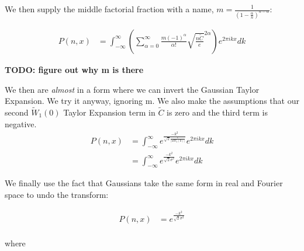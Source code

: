 \documentclass[10pt]{article} %
\begin{document}


We then supply the middle factorial fraction with a name, $m = \frac{1}{(1-\frac{\alpha}{n})^{n-\alpha}}$:

\begin{align}
  P(n,x) &= \int_{-\infty}^{\infty}\left(\sum_{\alpha=0}^\infty \frac{m(-1)^\alpha}{\alpha!}\sqrt{\frac{n\widetilde{C}}{e}}^{2\alpha}\right)e^{2\pi ikx}dk
\end{align}

\textbf{TODO: figure out why m is there}

We then are \textit{almost} in a form where we can invert the Gaussian Taylor Expansion. We try it anyway, ignoring m. We also make the assumptions
that our second $\widetilde{W}_1(0)$ Taylor Expansion term in $\widetilde{C}$ is zero and the third term is negative.\\

\begin{align}
  P(n,x) &= \int_{-\infty}^{\infty}e^{\frac{-k^2}{\sqrt{2}\frac{e}{|nW_2(0)|}}}e^{2\pi ikx}dk\\
  &= \int_{-\infty}^{\infty}e^{\frac{-k^2}{\sqrt{2}\sigma^2}}e^{2\pi ikx}dk
\end{align}

We finally use the fact that Gaussians take the same form in real and Fourier space to undo the transform:

\begin{align}
  P(n,x) &= e^{\frac{-k^2}{\sqrt{2}\sigma^2}}\\
\end{align}

where
\end{document}
